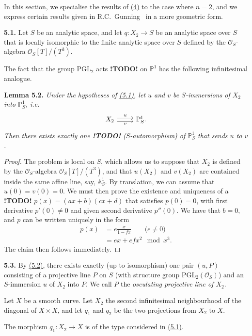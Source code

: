 \documentclass{report}
\newenvironment{itenv}[1]
  {\phantomsection\par\medskip\noindent\textbf{#1.}\itshape}
  {\medskip}
\newenvironment{rmenv}[1]
  {\phantomsection\par\medskip\noindent\textbf{#1.}\rmfamily}
  {\medskip}
\renewcommand{\cal}[1]{{\mathcal{#1}}}
\newcommand{\PP}{\mathbb{P}}
\renewcommand{\AA}{\mathbb{A}}
\newcommand{\todo}{\textbf{ !TODO! }}
\newcommand{\oldpage}[1]{\marginpar{\footnotesize$\Big\vert$ \textit{p.~#1}}}
\begin{document}
In this section, we specialise the results of \hyperref[I.4]{(4)} to the case where $n=2$, and we express certain results given in R.C.~Gunning~\cite{11} in a more geometric form.

\begin{rmenv}{5.1}
\label{I.5.1}
  Let $S$ be an analytic space, and let $q\colon X_2\to S$ be an analytic space over $S$ that is locally isomorphic to the finite analytic space over $S$ defined by the $\cal{O}_S$-algebra $\cal{O}_S[T]/(T^3)$.

  The fact that the group $\mathrm{PGL}_2$ acts \todo on $\PP^1$ has the following infinitesimal analogue.
\end{rmenv}

\begin{itenv}{Lemma 5.2}
\label{I.5.2}
  Under the hypotheses of \hyperref[I.5.1]{(5.1)}, let $u$ and $v$ be $S$-immersions of $X_2$ into $\PP_S^1$, i.e.
  \[
    \begin{tikzcd}
      X_2 \rar[shift left=1,"u"] \rar[shift right=1,swap,"v"]
      & \PP_S^1.
    \end{tikzcd}
  \]
  Then there exists exactly one \todo ($S$-automorphism) of $\PP_S^1$ that sends $u$ to $v$.
\end{itenv}

\begin{proof}
  The problem is local on $S$, which allows us to suppose that $X_2$ is defined by the $\cal{O}_S$-algebra $\cal{O}_S[T]/(T^3)$, and that $u(X_2)$ and $v(X_2)$ are contained inside the same affine line, say, $\AA_S^1$.
  By translation, we can assume that $u(0)=v(0)=0$.
  We must then prove the existence and uniqueness of a \todo $p(x)=(ax+b)(cx+d)$ that satisfies $p(0)=0$, with first derivative $p'(0)\neq0$ and given second derivative $p''(0)$.
  We have that $b=0$, and $p$ can be written uniquely in the form
\oldpage{30}
  \[
    \begin{aligned}
      p(x)
      &= e\frac{x}{1-fx} \qquad\mbox{($e\neq0$)}
    \\&= ex + efx^2 \mod x^3.
    \end{aligned}
  \]
  The claim then follows immediately.
\end{proof}

\begin{rmenv}{5.3}
\label{I.5.3}
  By \hyperref[I.5.2]{(5.2)}, there exists exactly (up to isomorphism) one pair $(u,P)$ consisting of a projective line $P$ on $S$ (with structure group $\mathrm{PGL}_2(\cal{O}_S)$) and an $S$-immersion $u$ of $X_2$ into $P$.
  We call $P$ the \emph{osculating projective line of $X_2$}.

  Let $X$ be a smooth curve.
  Let $X_2$ the second infinitesimal neighbourhood of the diagonal of $X\times X$, and let $q_1$ and $q_2$ be the two projections from $X_2$ to $X$.

  The morphism $q_1\colon X_2\to X$ is of the type considered in \hyperref[I.5.1]{(5.1)}.
\end{rmenv}
\end{document}
